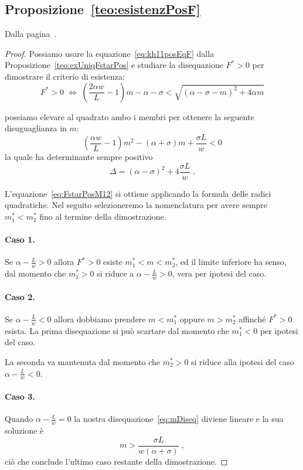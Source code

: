 \subsection{ Proposizione~\ref{teo:esistenzPosF} }
Dalla pagina~\pageref{teo:esistenzPosF}.

\begin{proof}
Possiamo usare la equazione~\eqref{eq:kh11posEqF} dalla Proposizione~\ref{teo:exUniqFstarPos} e studiare
la disequazione $F^* >0$ per dimostrare il criterio di esistenza:
$$F^* > 0 \; \iff \;
\left( \frac{2 \alpha w}{L} -1 \right) m - \alpha - \sigma < \sqrt{ {(\alpha - \sigma -m)}^2 + 4 \alpha m }$$

possiamo elevare al quadrato ambo i membri per ottenere la seguente disuguaglianza in $m$:
\begin{equation}
    \left( \frac{\alpha w}{L} -1 \right) m^2 -( \alpha + \sigma) m + \frac{\sigma L}{w} < 0
    \label{eq:mDiseq}
\end{equation}
la quale ha determinante sempre positivo
$$\Delta = {(\alpha -\sigma)}^2 +4 \frac{\sigma L}{w} \; .$$

L'equazione~\eqref{eq:FstarPosM12} si ottiene applicando la formula delle radici quadratiche.
Nel seguito selezioneremo la nomenclatura per avere sempre $m_1^* < m_2^*$ fino al termine della dimostrazione.

\paragraph{Caso 1.}
Se $\alpha - \frac{L}{w} >0$ allora $F^*>0$ esiste $m_1^* < m < m_2^*$, ed il limite inferiore ha senso,
dal momento che
$m_1^* > 0$ si riduce a $\alpha - \frac{L}{w}>0$, vera per ipotesi del caso.

\paragraph{Caso 2.}
Se $\alpha -\frac{L}{w} <0$ allora dobbiamo prendere $m < m_1^*$ oppure $m > m_2^*$ affinché $F^* >0$ esista.
La prima disequazione si può scartare dal momento che $m_1^* <0$ per ipotesi del caso.

La seconda va mantenuta dal momento che $m_2^* >0$ si riduce alla ipotesi del caso $\alpha - \frac{L}{w} < 0$.

\paragraph{Caso 3.}
Quando $\alpha - \frac{L}{w} =0$ la nostra disequazione~\eqref{eq:mDiseq} diviene lineare e la sua soluzione è
$$m > \frac{\sigma L}{w (\alpha +\sigma)} \; ,$$
ciò che conclude l'ultimo caso restante della dimostrazione.
\end{proof}


